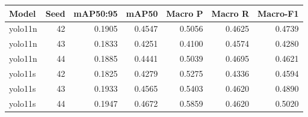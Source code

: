 \begin{tabular}{lrrrrrr}
\toprule
Model & Seed & mAP50:95 & mAP50 & Macro P & Macro R & Macro-F1 \\
\midrule
yolo11n & 42 & 0.1905 & 0.4547 & 0.5056 & 0.4625 & 0.4739 \\
yolo11n & 43 & 0.1833 & 0.4251 & 0.4100 & 0.4574 & 0.4280 \\
yolo11n & 44 & 0.1885 & 0.4441 & 0.5039 & 0.4695 & 0.4621 \\
yolo11s & 42 & 0.1825 & 0.4279 & 0.5275 & 0.4336 & 0.4594 \\
yolo11s & 43 & 0.1933 & 0.4565 & 0.5403 & 0.4620 & 0.4890 \\
yolo11s & 44 & 0.1947 & 0.4672 & 0.5859 & 0.4620 & 0.5020 \\
\bottomrule
\end{tabular}
